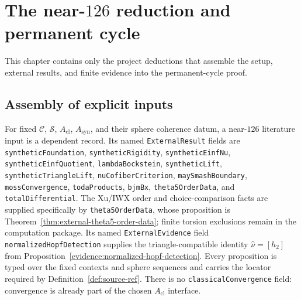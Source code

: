 \chapter{The near-$126$ reduction and permanent cycle}
\label{chap:near126}

This chapter contains only the project deductions that assemble the setup, external results, and finite evidence into the permanent-cycle proof.

\section{Assembly of explicit inputs}

\begin{definition}
  \label{def:near126-literature-input}
  \notready
  For fixed $\mathcal C$, $\mathcal S$, $A_{\mathrm{cl}}$,
  $A_{\mathrm{syn}}$, and their sphere coherence datum, a near-$126$
  literature input is a dependent record.  Its named \texttt{ExternalResult}
  fields are \texttt{syntheticFoundation}, \texttt{syntheticRigidity},
  \texttt{syntheticEinfNu}, \texttt{syntheticEinfQuotient},
  \texttt{lambdaBockstein}, \texttt{syntheticLift},
  \texttt{syntheticTriangleLift}, \texttt{nuCofiberCriterion},
  \texttt{maySmashBoundary}, \texttt{mossConvergence},
  \texttt{todaProducts}, \texttt{bjmBx}, \texttt{theta5OrderData}, and
  \texttt{totalDifferential}.  The Xu/IWX order and choice-comparison facts are
  supplied specifically by \texttt{theta5OrderData}, whose proposition is
  Theorem~\ref{thm:external-theta5-order-data}; finite torsion exclusions remain
  in the computation package.  Its named \texttt{ExternalEvidence} field
  \texttt{normalizedHopfDetection} supplies the triangle-compatible identity
  $\widehat\nu=[h_2]$ from
  Proposition~\ref{evidence:normalized-hopf-detection}.  Every proposition is
  typed over the fixed contexts and sphere sequences and carries the locator
  required by Definition~\ref{def:source-ref}.  There is no
  \texttt{classicalConvergence} field: convergence is already part of the
  chosen $A_{\mathrm{cl}}$ interface.
\end{definition}

